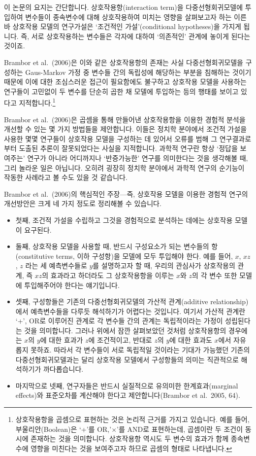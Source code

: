 \documentclass[
]{book}
\begin{document}
이 논문의 요지는 간단합니다. 상호작용항(interaction term)을 다중선형회귀모델에 투입하여 변수들이 종속변수에 대해 상호작용하여 미치는 영향을 살펴보고자 하는 이른바 상호작용 모델의 연구가설은 `조건적인 가설'(conditional hypotheses)을 가지게 됩니다. 즉, 서로 상호작용하는 변수들은 각자에 대하여 `의존적인' 관계에 놓이게 된다는 것이죠.

Brambor et al.~(2006)은 이와 같은 상호작용항의 존재는 사실 다중선형회귀모델을 구성하는 Gaus-Markov 가정 중 변수들 간의 독립성에 해당하는 부분을 침해하는 것이기 때문에 이에 대한 조심스러운 접근이 필요함에도 불구하고 상호작용 모델을 사용하는 연구들이 고민없이 두 변수를 단순히 곱한 채 모델에 투입하는 등의 행태를 보이고 있다고 지적합니다.\footnote{상호작용항을 곱셈으로 표현하는 것은 논리적 근거를 가지고 있습니다. 예를 들어, 부울리안(Boolean)은 `+'를 OR,'\(\times\)'를 AND로 표현하는데, 곱셈이란 두 조건이 동시에 존재하는 것을 의미합니다. 상호작용항 역시도 두 변수의 효과가 함께 종속변수에 영향을 미친다는 것을 보여주고자 하므로 곱셈의 형태로 나타냅니다.}

Brambor et al.~(2006)은 곱셈을 통해 만들어낸 상호작용항을 이용한 경험적 분석을 개선할 수 있는 몇 가지 방법들을 제안합니다. 이들은 정치학 분야에서 조건적 가설을 사용한 몇몇 연구들이 상호작용 모델을 구성하는 데 있어서 오류를 범해 그 연구결과로부터 도출된 추론이 잘못되었다는 사실을 지적합니다. 과학적 연구란 항상 `정답을 보여주는' 연구가 아니라 어디까지나 `반증가능한' 연구를 의미한다는 것을 생각해볼 때, 그리 놀라운 일은 아닙니다. 오히려 굉장히 정치학 분야에서 과학적 연구의 순기능이 작동한 사례라고 볼 수도 있을 것 같습니다.

Brambor et al.~(2006)의 핵심적인 주장---즉, 상호작용 모델을 이용한 경험적 연구의 개선방안은 크게 네 가지 정도로 정리해볼 수 있습니다.

\begin{itemize}
\item
  첫째, 조건적 가설을 수립하고 그것을 경험적으로 분석하는 데에는 상호작용 모델이 요구된다.
\item
  둘째, 상호작용 모델을 사용할 때, 반드시 구성요소가 되는 변수들의 항(constitutive terms, 이하 구성항)을 모델에 모두 투입해야 한다. 예를 들어, \(x\), \(xz\), \(z\) 라는 세 예측변수들로 \(y\)를 설명하고자 할 때, 우리의 관심사가 상호작용의 관계, 즉 \(xz\)의 효과라고 하더라도 그 상호작용항을 이루는 \(x\)와 \(z\)의 각 변수 또한 모델에 투입해주어야 한다는 얘기입니다.
\item
  셋째, 구성항들은 기존의 다중선형회귀모델의 가산적 관계(additive relationship)에서 예측변수들을 다루듯 해석하기가 어렵다는 것입니다. 여기서 가산적 관계란 `+', OR로 이루어진 관계로 각 변수들 간의 관계는 독립적이라는 가정이 성립된다는 것을 의미합니다. 그러나 위에서 잠깐 살펴보았던 것처럼 상호작용항의 경우에는 \(x\)의 \(y\)에 대한 효과가 \(z\)에 조건적이고, 반대로 \(z\)의 \(y\)에 대한 효과도 \(x\)에서 자유롭지 못하죠. 따라서 각 변수들이 서로 독립적일 것이라는 기대가 가능했던 기존의 다중선형회귀모델과는 달리 상호작용 모델에서 구성항들의 의미는 직관적으로 해석하기가 까다롭습니다.
\item
  마지막으로 넷째, 연구자들은 반드시 실질적으로 유의미한 한계효과(marginal effects)와 표준오차를 계산해야 한다고 제안합니다(Brambor et al.~2005, 64).
\end{itemize}
\end{document}
